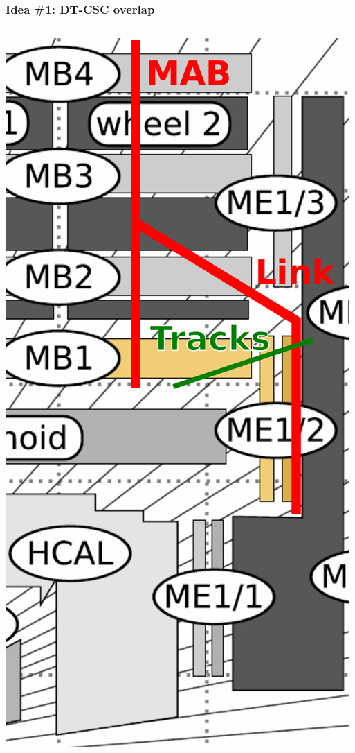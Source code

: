 \documentclass[compress]{beamer}
\begin{document}
\begin{frame}
\frametitle{Idea \#1: DT-CSC overlap}
\begin{columns}
\includegraphics[width=\linewidth]{overlap_region.pdf}


\end{columns}
\end{frame}
\end{document}
